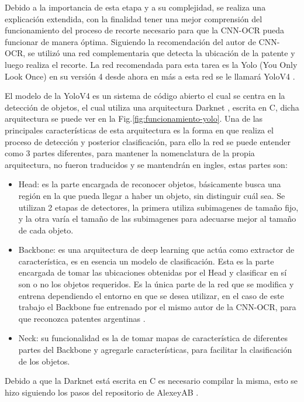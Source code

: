 Debido a la importancia de esta etapa y a su complejidad, se realiza una explicación extendida, con la finalidad tener una mejor comprensión del funcionamiento del proceso de recorte necesario para que la CNN-OCR pueda funcionar de manera óptima. Siguiendo la recomendación del autor de CNN-OCR, se utilizó una red complementaria que detecta la ubicación de la patente y luego realiza el recorte. La red recomendada para esta tarea es la Yolo (You Only Look Once) en su versión 4 desde ahora en más a esta red se le llamará YoloV4 \cite{bochkovskiy_yolov4_2020}.


El modelo de la YoloV4 es un sistema de código abierto el cual se centra en la detección de objetos, el cual utiliza una arquitectura Darknet \cite{noauthor_darknet_nodate}, escrita en C, dicha arquitectura se puede ver en la Fig.\ref{fig:funcionamiento-yolo}.
Una de las principales características de esta arquitectura es la forma en que realiza el proceso de detección y posterior clasificación, para ello la red se puede entender como 3 partes diferentes, para mantener la nomenclatura de la propia arquitectura, no fueron traducidos y se mantendrán en ingles, estas partes son:

\begin{itemize}
    \item Head: es la parte encargada de reconocer objetos, básicamente busca una región en la que pueda llegar a haber un objeto, sin distinguir cuál sea. Se utilizan 2 etapas de detectores, la primera utiliza subimagenes de tamaño fijo, y la otra varía el tamaño de las subimagenes para adecuarse mejor al tamaño de cada objeto.
    \item Backbone: es una arquitectura de deep learning que actúa como extractor de característica, es en esencia un modelo de clasificación. Esta es la parte encargada de tomar las ubicaciones obtenidas por el Head y clasificar en sí son o no los objetos requeridos. Es la única parte de la red que se modifica y entrena dependiendo el entorno en que se desea utilizar, en el caso de este trabajo el Backbone fue entrenado por el mismo autor de la CNN-OCR, para que reconozca patentes argentinas \cite{ankandrew_localizador_2021}.
    \item Neck: su funcionalidad es la de tomar mapas de característica de diferentes partes del Backbone y agregarle características, para facilitar la clasificación de los objetos.
\end{itemize}

Debido a que la Darknet está escrita en C es necesario compilar la misma, esto se hizo siguiendo los pasos del repositorio de AlexeyAB \cite{alexey_yolo_2023}.


